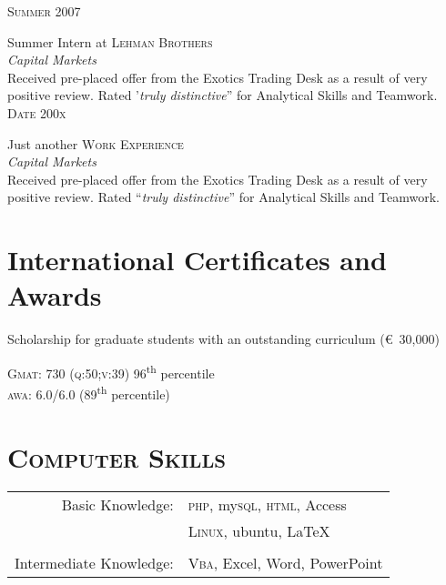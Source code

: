 \documentclass[10pt]{article}
\begin{document}
{\begin{minipage}[t]{0.5\textwidth}
	\raggedleft
	\textsc{\normalsize Summer 2007}\par

	\raggedright\large Summer Intern at \textsc{Lehman Brothers}\\
	\emph{Capital Markets}\\[5pt]

	\normalsize{Received pre-placed offer from the Exotics Trading Desk as a result of very positive review. Rated '\emph{truly distinctive}'' for Analytical Skills and Teamwork.}\\[10pt]

	\raggedleft
	\textsc{\normalsize Date 200x}\par

	\raggedright\large Just another \textsc{Work Experience}\\
	\emph{Capital Markets}\\[5pt]

	\normalsize{Received pre-placed offer from the Exotics Trading Desk as a result of very positive review. Rated ``\emph{truly distinctive}'' for Analytical Skills and Teamwork.}\\[10pt]

\section{International Certificates and Awards}
	\par\raggedright
	Scholarship for graduate students with an outstanding curriculum (\euro\  30,000)\normalsize\\[3pt]
	
	\par\raggedright
	\textsc{Gmat}\textregistered: 730 (\textsc{q:50;v:39}) 96\textsuperscript{th} percentile\\ \textsc{awa}: 6.0/6.0 (89\textsuperscript{th} percentile)\\[10pt]

\section{\textsc{Computer Skills}}

	\begin{tabular}{rl}
		Basic Knowledge:	& \textsc{php}, my\textsc{sql}, \textsc{html}, Access\\
						& \textsc{Linux}, ubuntu, {\LaTeX}\\ 
						& \\
	Intermediate Knowledge: & \textsc{Vba}, Excel, Word, PowerPoint\\
	\end{tabular}
	

\end{minipage}}
\end{document}
